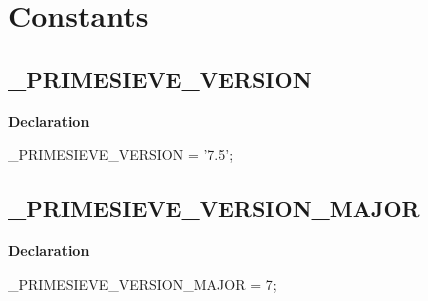 \documentclass{report}
\newif\ifpdf
\begin{document}
\section{Constants}
\ifpdf
\subsection*{\large{\textbf{{\_}PRIMESIEVE{\_}VERSION}}\normalsize\hspace{1ex}\hrulefill}
\else
\subsection*{{\_}PRIMESIEVE{\_}VERSION}
\fi
\label{primesieve-_PRIMESIEVE_VERSION}
\begin{list}{}{
\setlength{\itemindent}{0cm}
\setlength{\listparindent}{0cm}
\setlength{\leftmargin}{\evensidemargin}
\addtolength{\leftmargin}{\tmplength}
\settowidth{\labelsep}{X}
\addtolength{\leftmargin}{\labelsep}
\setlength{\labelwidth}{\tmplength}
}
\item[\textbf{Declaration}\hfill]
\ifpdf
\begin{flushleft}
\fi
\begin{ttfamily}
{\_}PRIMESIEVE{\_}VERSION = '7.5';\end{ttfamily}

\ifpdf
\end{flushleft}
\fi

\end{list}
\ifpdf
\subsection*{\large{\textbf{{\_}PRIMESIEVE{\_}VERSION{\_}MAJOR}}\normalsize\hspace{1ex}\hrulefill}
\else
\subsection*{{\_}PRIMESIEVE{\_}VERSION{\_}MAJOR}
\fi
\label{primesieve-_PRIMESIEVE_VERSION_MAJOR}
\begin{list}{}{
\setlength{\itemindent}{0cm}
\setlength{\listparindent}{0cm}
\setlength{\leftmargin}{\evensidemargin}
\addtolength{\leftmargin}{\tmplength}
\settowidth{\labelsep}{X}
\addtolength{\leftmargin}{\labelsep}
\setlength{\labelwidth}{\tmplength}
}
\item[\textbf{Declaration}\hfill]
\ifpdf
\begin{flushleft}
\fi
\begin{ttfamily}
{\_}PRIMESIEVE{\_}VERSION{\_}MAJOR = 7;\end{ttfamily}

\ifpdf
\end{flushleft}
\fi

\end{list}
\ifpdf
\end{document}
